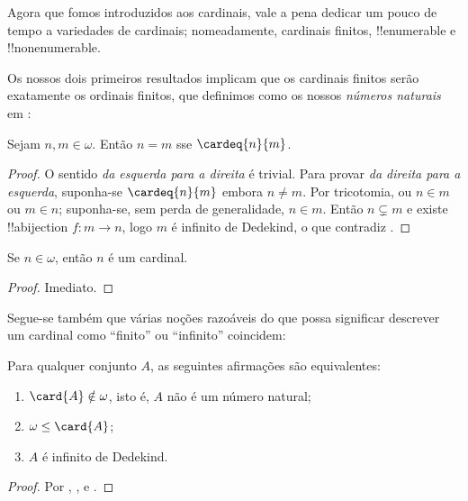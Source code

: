 \documentclass[../../../include/open-logic-section]{subfiles}
\begin{document}

Agora que fomos introduzidos aos cardinais, vale a pena dedicar um
pouco de tempo a variedades de cardinais;
nomeadamente, cardinais finitos, !!{enumerable} e !!{nonenumerable}.

Os nossos dois primeiros resultados implicam que os cardinais finitos serão exatamente
os ordinais finitos, que definimos como os nossos \emph{números naturais}
em :

\begin{prop}
Sejam $n, m \in \omega$. Então $n = m$ sse $\cardeq{n}{m}$.
\end{prop}

\begin{proof}
O sentido \emph{da esquerda para a direita} é trivial. Para provar \emph{da direita para a esquerda},
suponha-se $\cardeq{n}{m}$ embora $n \neq m$. Por tricotomia, ou $n
\in m$ ou $m \in n$; suponha-se, sem perda de generalidade, $n \in m$.
Então $n \subsetneq m$ e existe !!a{bijection} $f \colon m \to n$,
logo $m$ é infinito de Dedekind, o que contradiz
.
\end{proof}

\begin{cor}
Se $n \in \omega$, então $n$ é um cardinal.
\end{cor}

\begin{proof}
Imediato.
\end{proof}
\noindent
Segue-se também que várias noções razoáveis do que possa significar
descrever um cardinal como ``finito'' ou ``infinito'' coincidem:
\begin{thm}Para qualquer conjunto $A$, as seguintes afirmações são equivalentes:
\begin{enumerate}
	\item{} $\card{A} \notin \omega$, isto é,
	$A$ não é um número natural;
	\item{} $\omega \leq \card{A}$;
	\item{} $A$ é infinito de Dedekind.
\end{enumerate}
\end{thm}

\begin{proof}
Por ,
, e
.
\end{proof}
\end{document}
